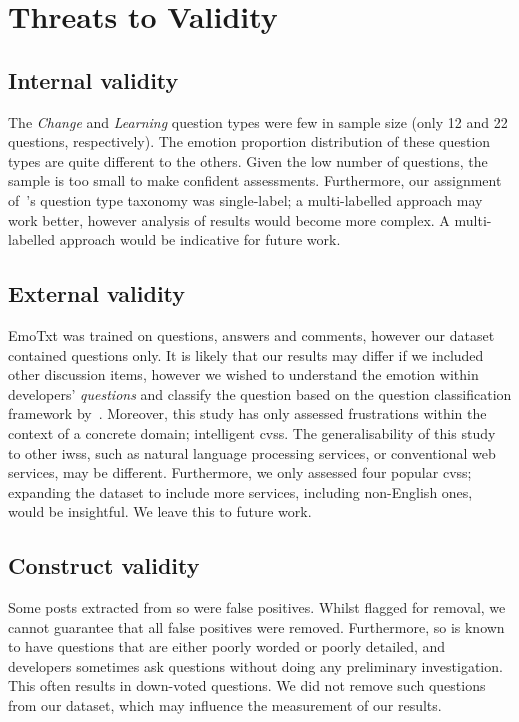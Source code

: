 \section{Threats to Validity}\label{semotion2021:sec:threats}

\subsection{Internal validity} 
The \textit{ Change} and \textit{Learning} question types were few in sample size (only 12 and 22 questions, respectively). The emotion  proportion distribution of these question types are  quite different to the others.  Given the low number of questions, the sample is too small to make confident assessments. Furthermore, our assignment of~\citeauthor{Beyer:2018fm}'s question type taxonomy was single-label; a multi-labelled approach may work better, however analysis of results would become more complex. A multi-labelled approach would be indicative for future work. 

\subsection{External validity}
EmoTxt was trained on questions, answers and comments, however our dataset contained questions only. It is likely that our results may differ if we included other discussion items, however we wished to understand the emotion within developers' \textit{questions} and classify the question based on the question classification framework by~\citet{Beyer:2018fm}. Moreover, this study has only assessed frustrations within the context of a concrete domain; intelligent \glspl{cvs}. The generalisability of this study to other \glspl{iws}, such as natural language processing services, or conventional web services, may be different. Furthermore, we only assessed four popular \glspl{cvs}; expanding the dataset to include more services, including non-English ones, would be insightful. We leave this to future work.

\subsection{Construct validity}
Some posts extracted from \gls{so} were false positives. Whilst flagged for removal, we cannot guarantee that all false positives were removed. Furthermore, \gls{so} is known to have questions that are either poorly worded or poorly detailed, and developers sometimes ask questions without doing any preliminary investigation. This often results in down-voted questions. We did not remove such questions from our dataset, which may influence the measurement of our results.

